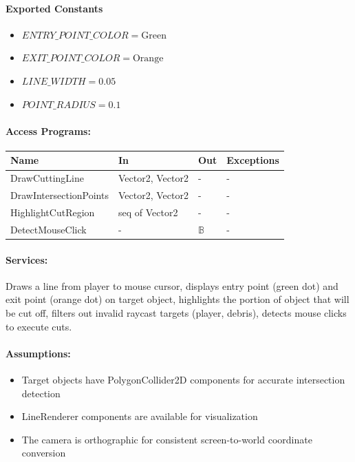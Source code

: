 \documentclass[12pt, titlepage]{article}
\begin{document}
\paragraph{Exported Constants}
\begin{itemize}
\item $ENTRY\_POINT\_COLOR = \text{Green}$
\item $EXIT\_POINT\_COLOR = \text{Orange}$
\item $LINE\_WIDTH = 0.05$
\item $POINT\_RADIUS = 0.1$
\end{itemize}

\paragraph{Access Programs:}

\begin{center}
\begin{tabular}{p{45mm}p{35mm}p{1cm}p{3cm}}
\toprule
\textbf{Name} & \textbf{In} & \textbf{Out} & \textbf{Exceptions} \\
\midrule
DrawCuttingLine & Vector2, Vector2 & - & - \\
DrawIntersectionPoints & Vector2, Vector2 & - & - \\
HighlightCutRegion & seq of Vector2 & - & - \\
DetectMouseClick & - & $\mathbb{B}$ & - \\
\bottomrule
\end{tabular}
\end{center}

\paragraph{Services:}
Draws a line from player to mouse cursor, displays entry point (green dot) and exit point (orange dot) on target object, highlights the portion of object that will be cut off, filters out invalid raycast targets (player, debris), detects mouse clicks to execute cuts.

\paragraph{Assumptions:}
\begin{itemize}
\item Target objects have PolygonCollider2D components for accurate intersection detection
\item LineRenderer components are available for visualization
\item The camera is orthographic for consistent screen-to-world coordinate conversion
\end{itemize}
\end{document}
